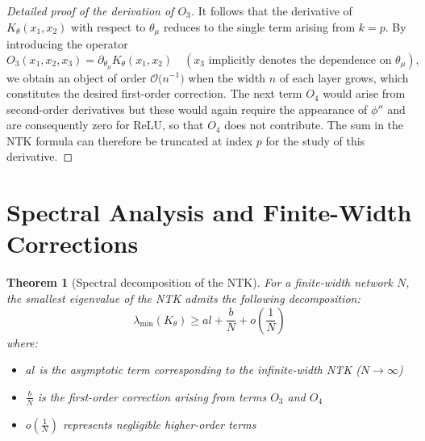 \documentclass{article}
\newtheorem{proof}{Proof}
\newtheorem{theorem}{Theorem}
\begin{document}
\begin{proof}[Detailed proof of the derivation of $O_3$]
It follows that the derivative of $K_{\theta}(x_1,x_2)$ with respect to $\theta_{\mu}$ reduces to the single term arising from $k=p$. By introducing the operator
\[
 O_3(x_1,x_2,x_3)=\partial_{\theta_{\mu}}K_{\theta}(x_1,x_2)\quad(\text{$x_3$ implicitly denotes the dependence on }\theta_{\mu}),
\]
we obtain an object of order $\mathcal O\bigl(n^{-1}\bigr)$ when the width $n$ of each layer grows, which constitutes the desired first-order correction. The next term $O_4$ would arise from second-order derivatives but these would again require the appearance of $\phi''$ and are consequently zero for ReLU, so that $O_4$ does not contribute. The sum in the NTK formula can therefore be truncated at index $p$ for the study of this derivative.
\end{proof}

\section{Spectral Analysis and Finite-Width Corrections}

\begin{theorem}[Spectral decomposition of the NTK]
For a finite-width network $N$, the smallest eigenvalue of the NTK admits the following decomposition:
\[ \lambda_{\min}(K_\theta) \geq al + \frac{b}{N} + o(\frac{1}{N}) \]
where:
\begin{itemize}
\item $al$ is the asymptotic term corresponding to the infinite-width NTK ($N \to \infty$)
\item $\frac{b}{N}$ is the first-order correction arising from terms $O_3$ and $O_4$
\item $o(\frac{1}{N})$ represents negligible higher-order terms
\end{itemize}
\end{theorem}
\end{document}

